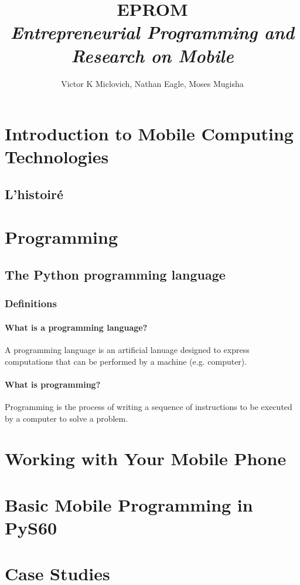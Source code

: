\documentclass[10pt,a4paper]{book}
\begin{document}
\title{EPROM\\
\textsl{Entrepreneurial Programming and Research on Mobile}}
\author{Victor K Miclovich, Nathan Eagle, Moses Mugisha}
\maketitle
\tableofcontents
\part{Introduction to Mobile Computing Technologies}
\chapter{L'histoir\'e}

\part{Programming}

\chapter{The Python programming language}
\section{Definitions}
\subsection*{What is a programming language?}
A programming language is an artificial lanuage designed to express computations that can be performed by a machine (e.g. computer).
\subsection*{What is programming?}
Programming is the process of writing a sequence of instructions to be executed by a computer to solve a problem.

\part{Working with Your Mobile Phone}

\part{Basic Mobile Programming in PyS60}

\part{Case Studies}
\end{document}
